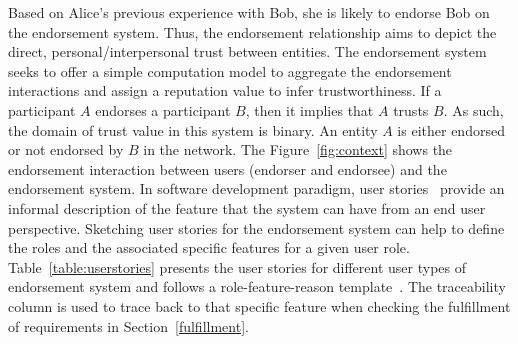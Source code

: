 Based on Alice's previous experience with Bob, she is likely to endorse Bob on
the endorsement system. Thus, the endorsement relationship aims to depict the
direct, personal/interpersonal trust between entities. The endorsement system
seeks to offer a simple computation model to aggregate the endorsement
interactions and assign a reputation value to infer trustworthiness. If a
participant $A$ endorses a participant $B$, then it implies that $A$ trusts
$B$. As such, the domain of trust value in this system is binary. An entity $A$
is either endorsed or not endorsed by $B$ in the network. The
Figure~\ref{fig:context} shows the endorsement interaction between users
(endorser and endorsee) and the endorsement system.  In software development
paradigm, user stories~\cite{cohn2004user} provide an informal description of
the feature that the system can have from an end user perspective. Sketching
user stories for the endorsement system can help to define the roles and the
associated specific features for a given user role.
Table~\ref{table:userstories} presents the user stories for different user
types of endorsement system and follows a role-feature-reason
template~\cite{agile1}. The traceability column is used to trace back to that
specific feature when checking the fulfillment of requirements in
Section~\ref{fulfillment}. 

